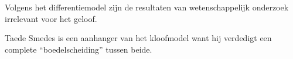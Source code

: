\documentclass[main.tex]{subfiles}
\begin{document}
\begin{examenvraag}
    \begin{stelling}
        Volgens het differentiemodel zijn de resultaten van wetenschappelijk onderzoek irrelevant voor het geloof.
    \end{stelling}

    \begin{antwoord}
    \end{antwoord}
\end{examenvraag}


\begin{examenvraag}
    \begin{stelling}
        Taede Smedes is een aanhanger van het kloofmodel want hij verdedigt een complete “boedelscheiding” tussen beide.
    \end{stelling}

    \begin{antwoord}
    \end{antwoord}
\end{examenvraag}
\end{document}
